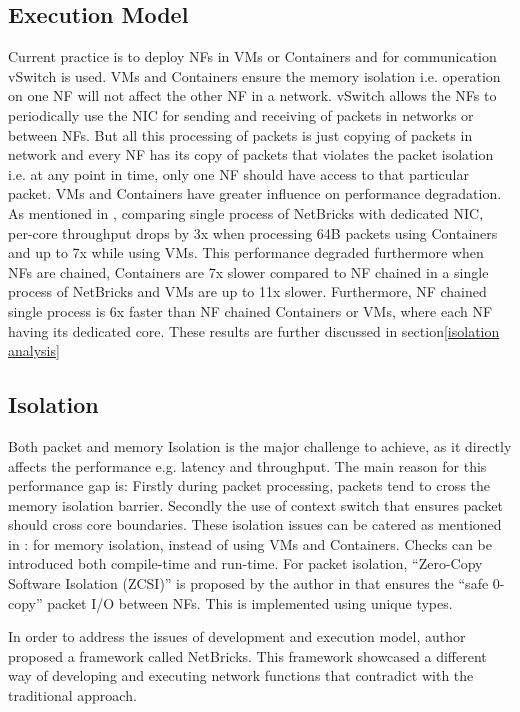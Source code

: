 \documentclass[10pt, a4paper, conference]{IEEEtran}
\begin{document}
\subsection{Execution Model}
Current practice is to deploy NFs in VMs or Containers and for communication vSwitch is used. VMs and Containers ensure the memory isolation i.e. operation on one NF will not affect the other NF in a network. vSwitch allows the NFs to periodically use the NIC for sending and receiving of packets in networks or between NFs. But all this processing of packets is just copying of packets in network and every NF has its copy of packets that violates the packet isolation i.e. at any point in time, only one NF should have access to that particular packet. VMs and Containers have  greater influence on performance degradation. As mentioned in \cite{Panda2016}, comparing single process of NetBricks with dedicated NIC, per-core throughput drops by 3x when processing 64B packets using Containers and up to 7x while using VMs. This performance degraded furthermore when NFs are chained, Containers are 7x slower compared to NF chained in a single process of NetBricks and VMs are up to 11x slower. Furthermore, NF chained single process is 6x faster than NF chained Containers or VMs, where each NF having its dedicated core. These results are further discussed in section\ref{isolation analysis} 
\subsection{Isolation}
Both packet and memory Isolation is the major challenge to achieve, as it directly affects the performance e.g. latency and throughput. The main reason for this performance gap is: Firstly during packet processing, packets tend to cross the memory isolation barrier. Secondly the use of context switch that ensures packet should cross core boundaries. These isolation issues can be catered as mentioned in \cite{Panda2016}: for memory isolation, instead of using VMs and Containers. Checks can be introduced both compile-time and run-time. For packet isolation, “Zero-Copy Software Isolation (ZCSI)” is proposed by the author in \cite{Panda2016} that ensures the “safe 0-copy” packet I/O between NFs. This is implemented using unique types\cite{Gordon}.

In order to address the issues of development and execution model, author proposed a framework called NetBricks\cite{Panda2016}. This framework showcased a different way of developing and executing network functions that contradict with the traditional approach. 
\end{document}
